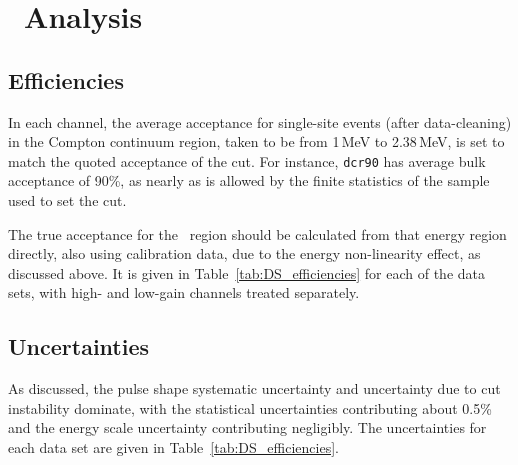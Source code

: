 \section{\MJ\ Analysis}
\subsection{Efficiencies}
In each channel, the average acceptance for single-site events (after data-cleaning) in the Compton continuum region, taken to be from 1\,MeV to 2.38\,MeV, is set to match the quoted acceptance of the cut. For instance, {\tt dcr90} has average bulk acceptance of 90\%, as nearly as is allowed by the finite statistics of the sample used to set the cut. 

The true acceptance for the \nonubb\ region should be calculated from that energy region directly, also using calibration data, due to the energy non-linearity effect, as discussed above. It is given in Table~\ref{tab:DS_efficiencies} for each of the data sets, with high- and low-gain channels treated separately.  

\subsection{Uncertainties}
As discussed, the pulse shape systematic uncertainty and uncertainty due to cut instability dominate, with the statistical uncertainties contributing about 0.5\% and the energy scale uncertainty contributing negligibly. The uncertainties for each data set are given in Table~\ref{tab:DS_efficiencies}. 

